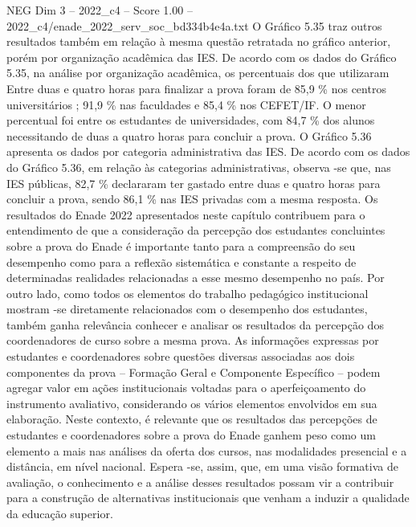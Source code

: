 \begin{textsample}{NEG Dim 3 – 2022\_c4 – Score 1.00 – 2022\_c4/enade\_2022\_serv\_soc\_bd334b4e4a.txt}
O Gráfico 5.35 traz outros resultados também em relação à mesma questão retratada no gráfico anterior, porém por organização acadêmica das IES.
De acordo com os dados do Gráfico 5.35, na análise por organização acadêmica, os percentuais dos que utilizaram Entre duas e quatro horas para finalizar a prova foram de 85,9 \% nos centros universitários ; 91,9 \% nas faculdades e 85,4 \% nos CEFET/IF.
O menor percentual foi entre os estudantes de universidades, com 84,7 \% dos alunos necessitando de duas a quatro horas para concluir a prova.
O Gráfico 5.36 apresenta os dados por categoria administrativa das IES.
De acordo com os dados do Gráfico 5.36, em relação às categorias administrativas, observa -se que, nas IES públicas, 82,7 \% declararam ter gastado entre duas e quatro horas para concluir a prova, sendo 86,1 \% nas IES privadas com a mesma resposta.
Os resultados do Enade 2022 apresentados neste capítulo contribuem para o entendimento de que a consideração da percepção dos estudantes concluintes sobre a prova do Enade é importante tanto para a compreensão do seu desempenho como para a reflexão sistemática e constante a respeito de determinadas realidades relacionadas a esse mesmo desempenho no país.
Por outro lado, como todos os elementos do trabalho pedagógico institucional mostram -se diretamente relacionados com o desempenho dos estudantes, também ganha relevância conhecer e analisar os resultados da percepção dos coordenadores de curso sobre a mesma prova.
As informações expressas por estudantes e coordenadores sobre questões diversas associadas aos dois componentes da prova – Formação Geral e Componente Específico – podem agregar valor em ações institucionais voltadas para o aperfeiçoamento do instrumento avaliativo, considerando os vários elementos envolvidos em sua elaboração.
Neste contexto, é relevante que os resultados das percepções de estudantes e coordenadores sobre a prova do Enade ganhem peso como um elemento a mais nas análises da oferta dos cursos, nas modalidades presencial e a distância, em nível nacional.
Espera -se, assim, que, em uma visão formativa de avaliação, o conhecimento e a análise desses resultados possam vir a contribuir para a construção de alternativas institucionais que venham a induzir a qualidade da educação superior.

\end{textsample}
